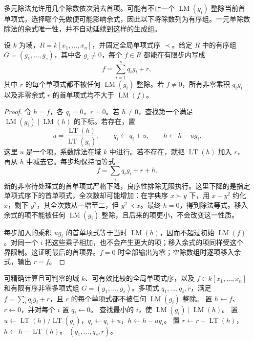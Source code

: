 多元除法允许用几个除数依次消去首项。可能有不止一个 \(\operatorname{LM}(g_i)\) 整除当前首单项式，选择哪个先做便可能影响余式，因此以下将除数列为有序组。一元单除数除法的余式唯一性，并不自动延续到这样的生成组。

\begin{theorem}[多元除法]\label{b3:thm:multivariate-division}
	设 \(k\) 为域，\(R=k[x_1,\ldots,x_n]\)，并固定全局单项式序 \(\prec\)。给定 \(R\) 中的有序组 \(G=(g_1,\ldots,g_s)\)，其中各 \(g_i\ne0\)，每个 \(f\in R\) 都能在有限步内写成
	\begin{equation}\label{b3:eq:multivariate-division}
		f=\sum_{i=1}^s q_i g_i+r,
	\end{equation}
	其中 \(r\) 的每个单项式都不被任何 \(\operatorname{LM}(g_i)\) 整除。若 \(f\ne0\)，所有非零乘积 \(q_i g_i\) 以及非零余式 \(r\) 的首单项式均不大于 \(\operatorname{LM}(f)\)。
\end{theorem}
\begin{proof}
	令 \(h=f\)，各 \(q_i=0\)，\(r=0\)。若 \(h\ne0\)，查找第一个满足 \(\operatorname{LM}(g_i)\mid\operatorname{LM}(h)\) 的下标。若存在，置
	\[
		u=\frac{\operatorname{LT}(h)}{\operatorname{LT}(g_i)}, \qquad q_i\longleftarrow q_i+u,\qquad h\longleftarrow h-ug_i.
	\]
	这里 \(u\) 是一个项，系数除法在域 \(k\) 中进行。若不存在，就把 \(\operatorname{LT}(h)\) 加入 \(r\)，再从 \(h\) 中减去它。每步均保持恒等式
	\[
		f=\sum_iq_ig_i+r+h.
	\]
	新的非零待处理式的首单项式严格下降，良序性排除无限执行。这里下降的是指定单项式序下的首单项式，全次数却可能增加：在字典序 \(x\succ y\) 下，用 \(x-y^2\) 约化 \(x\)，剩下 \(y^2\)，其全次数从一增至二，但 \(y^2\prec x\)。最终 \(h=0\)，得到除法等式。移入余式的项不能被任何 \(\operatorname{LM}(g_i)\) 整除，且后来的项更小，不会改变这一性质。

	每步加入的乘积 \(ug_i\) 的首单项式等于当时 \(\operatorname{LM}(h)\)，因而不超过初始 \(\operatorname{LM}(f)\)。对同一个 \(i\) 把这些乘子相加，也不会产生更大的项；移入余式的项同样受这个界限制。这证明最后的首项界。\(f=0\) 时全部输出为零；空除数组时逐项移入余式，输出 \(r=f\)。
\end{proof}

\begin{algorithm}[htbp]
	\caption{有序多元除法}
	\label{b3:alg:ordered-multivariate-division}
	\begin{algorithmsteps}{可精确计算且可判零的域 \(k\)、可有效比较的全局单项式序，以及 \(f\in k[x_1,\ldots,x_n]\) 和有限有序非零多项式组 \(G=(g_1,\ldots,g_s)\)。}{多项式 \(q_1,\ldots,q_s,r\)，满足 \(f=\sum_iq_ig_i+r\)，且 \(r\) 的每个单项式都不被任何 \(\operatorname{LM}(g_i)\) 整除。}
		\State 置 \(h\gets f\)、\(r\gets0\)，并对每个 \(i\) 置 \(q_i\gets0\)。
			\State 查找最小的 \(i\)，使 \(\operatorname{LM}(g_i)\mid\operatorname{LM}(h)\)。
				\State 置 \(u\gets\operatorname{LT}(h)/\operatorname{LT}(g_i)\)，\(q_i\gets q_i+u\)，\(h\gets h-ug_i\)。
			\Else
				\State 置 \(r\gets r+\operatorname{LT}(h)\)，\(h\gets h-\operatorname{LT}(h)\)。
			\EndIf
		\EndWhile
		\State \Return \((q_1,\ldots,q_s,r)\)。
	\end{algorithmsteps}
\end{algorithm}

